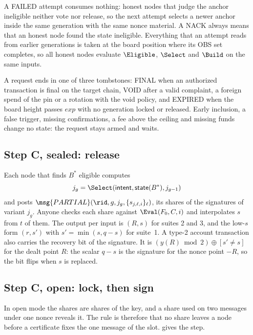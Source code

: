 A \textsf{FAILED} attempt consumes nothing: honest nodes that judge the anchor ineligible neither vote nor release, so the next attempt selects a newer anchor inside the same generation with the same nonce material. A NACK always means that an honest node found the state ineligible. Everything that an attempt reads from earlier generations is taken at the board position where its OBS set completes, so all honest nodes evaluate $\Eligible$, $\Select$ and $\Build$ on the same inputs.

A request ends in one of three tombstones: \textsf{FINAL} when an authorized transaction is final on the target chain, \textsf{VOID} after a valid complaint, a foreign spend of the pin or a rotation with the void policy, and \textsf{EXPIRED} when the board height passes $exp$ with no generation locked or released. Early inclusion, a false trigger, missing confirmations, a fee above the ceiling and missing funds change no state: the request stays armed and waits.

\subsection{Step C, sealed: release}\label{sec:sealed}

Each node that finds $B^*$ eligible computes
\[
  j_g = \Select(\textsf{intent}, \mathsf{state}(B^*), j_{g-1})
\]
and posts $\msg{PARTIAL}(\rid, g, j_g, \{s_{j,\ell,i}\}_\ell)$, its shares of the signatures of variant $j_g$. Anyone checks each share against $\Eval(F_0, C, i)$ and interpolates $s$ from $t$ of them. The output per input is $(R,s)$ for suites 2 and 3, and the low-$s$ form $(r, s')$ with $s' = \min(s, q-s)$ for suite~1. A type-2 account transaction also carries the recovery bit of the signature. It is $(y(R) \bmod 2) \oplus [s' \neq s]$ for the dealt point $R$: the scalar $q - s$ is the signature for the nonce point $-R$, so the bit flips when $s$ is replaced.

\subsection{Step C, open: lock, then sign}\label{sec:open}

In open mode the shares are shares of the key, and a share used on two messages under one nonce reveals it. The rule is therefore that no share leaves a node before a certificate fixes the one message of the slot.  gives the step.

